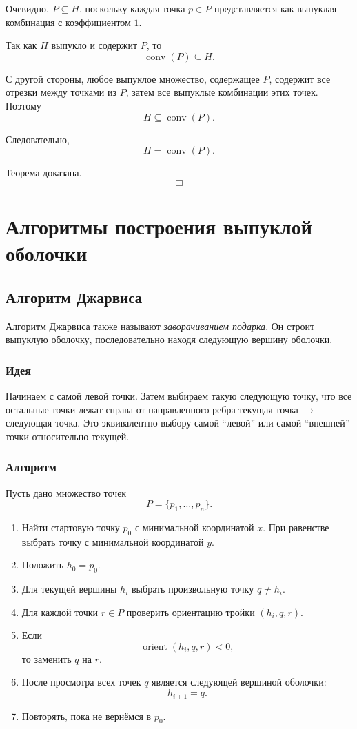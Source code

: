 \documentclass[12pt,a4paper]{article}
\begin{document}
Очевидно, \(P\subseteq H\), поскольку каждая точка \(p\in P\) представляется как выпуклая комбинация с коэффициентом \(1\).

Так как \(H\) выпукло и содержит \(P\), то
\[
\operatorname{conv}(P)\subseteq H.
\]

С другой стороны, любое выпуклое множество, содержащее \(P\), содержит все отрезки между точками из \(P\), затем все выпуклые комбинации этих точек. Поэтому
\[
H\subseteq \operatorname{conv}(P).
\]

Следовательно,
\[
H=\operatorname{conv}(P).
\]

Теорема доказана.
\[
\Box
\]

\section{Алгоритмы построения выпуклой оболочки}

\subsection{Алгоритм Джарвиса}

Алгоритм Джарвиса также называют \emph{заворачиванием подарка}. Он строит выпуклую оболочку, последовательно находя следующую вершину оболочки.

\subsubsection{Идея}

Начинаем с самой левой точки. Затем выбираем такую следующую точку, что все остальные точки лежат справа от направленного ребра текущая точка \(\to\) следующая точка. Это эквивалентно выбору самой ``левой'' или самой ``внешней'' точки относительно текущей.

\subsubsection{Алгоритм}

Пусть дано множество точек
\[
P=\{p_1,\dots,p_n\}.
\]

\begin{enumerate}
    \item Найти стартовую точку \(p_0\) с минимальной координатой \(x\). При равенстве выбрать точку с минимальной координатой \(y\).
    \item Положить \(h_0=p_0\).
    \item Для текущей вершины \(h_i\) выбрать произвольную точку \(q\neq h_i\).
    \item Для каждой точки \(r\in P\) проверить ориентацию тройки \((h_i,q,r)\).
    \item Если
    \[
    \operatorname{orient}(h_i,q,r)<0,
    \]
    то заменить \(q\) на \(r\).
    \item После просмотра всех точек \(q\) является следующей вершиной оболочки:
    \[
    h_{i+1}=q.
    \]
    \item Повторять, пока не вернёмся в \(p_0\).
\end{enumerate}
\end{document}
